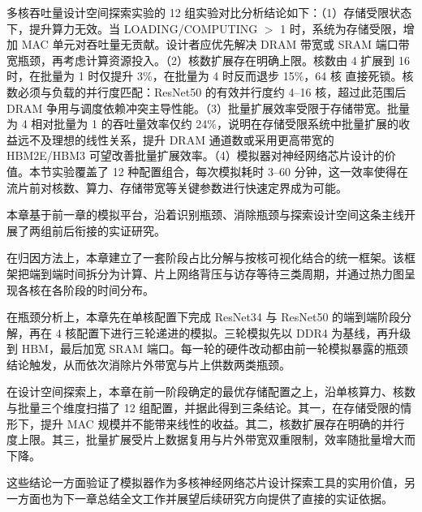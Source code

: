 \label{subsec:c4_dse_conclusion}

多核吞吐量设计空间探索实验的 12 组实验对比分析结论如下：（1）存储受限状态下，提升算力无效。当 LOADING/COMPUTING $>$ 1 时，系统为存储受限，增加 MAC 单元对吞吐量无贡献。设计者应优先解决 DRAM 带宽或 SRAM 端口带宽瓶颈，再考虑计算资源投入。（2）核数扩展存在明确上限。核数由 4 扩展到 16 时，在批量为 1 时仅提升 3\%，在批量为 4 时反而退步 15\%，64 核 直接死锁。核数必须与负载的并行度匹配：ResNet50 的有效并行度约 4--16 核，超过此范围后 DRAM 争用与调度依赖冲突主导性能。（3）批量扩展效率受限于存储带宽。批量为 4 相对批量为 1 的吞吐量效率仅约 24\%，说明在存储受限系统中批量扩展的收益远不及理想的线性关系，提升 DRAM 通道数或采用更高带宽的 HBM2E/HBM3 可望改善批量扩展效率。（4）模拟器对神经网络芯片设计的价值。本节实验覆盖了 12 种配置组合，每次模拟耗时 3--60 分钟，这一效率使得在流片前对核数、算力、存储带宽等关键参数进行快速定界成为可能。


\label{sec:c4_summary}

本章基于前一章的模拟平台，沿着识别瓶颈、消除瓶颈与探索设计空间这条主线开展了两组前后衔接的实证研究。

在归因方法上，本章建立了一套阶段占比分解与按核可视化结合的统一框架。该框架把端到端时间拆分为计算、片上网络背压与访存等待三类周期，并通过热力图呈现各核在各阶段的时间分布。

在瓶颈分析上，本章先在单核配置下完成 ResNet34 与 ResNet50 的端到端阶段分解，再在 4 核配置下进行三轮递进的模拟。三轮模拟先以 DDR4 为基线，再升级到 HBM，最后加宽 SRAM 端口。每一轮的硬件改动都由前一轮模拟暴露的瓶颈结论触发，从而依次消除片外带宽与片上供数两类瓶颈。

在设计空间探索上，本章在前一阶段确定的最优存储配置之上，沿单核算力、核数与批量三个维度扫描了 12 组配置，并据此得到三条结论。其一，在存储受限的情形下，提升 MAC 规模并不能带来线性的收益。其二，核数扩展存在明确的并行度上限。其三，批量扩展受片上数据复用与片外带宽双重限制，效率随批量增大而下降。

这些结论一方面验证了模拟器作为多核神经网络芯片设计探索工具的实用价值，另一方面也为下一章总结全文工作并展望后续研究方向提供了直接的实证依据。
